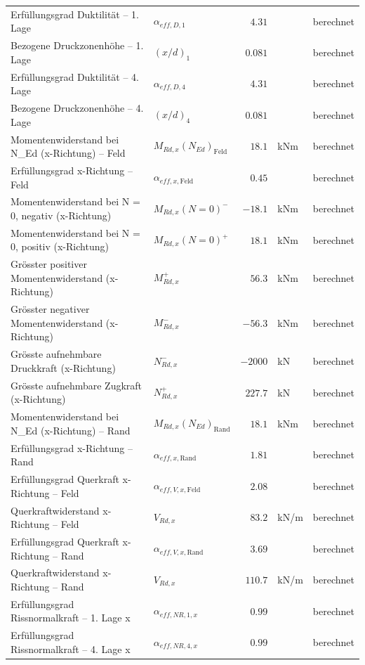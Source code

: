 \documentclass[11pt,a4paper]{article}
\begin{document}
\begin{xltabular}{\linewidth}{>{\raggedright\arraybackslash}Xlrll}
Erfüllungsgrad Duktilität – 1. Lage & $\alpha_{eff,D,1}$ & $4.31$ &  & berechnet \\
Bezogene Druckzonenhöhe – 1. Lage & $\left(x/d\right)_{1}$ & $0.081$ &  & berechnet \\
Erfüllungsgrad Duktilität – 4. Lage & $\alpha_{eff,D,4}$ & $4.31$ &  & berechnet \\
Bezogene Druckzonenhöhe – 4. Lage & $\left(x/d\right)_{4}$ & $0.081$ &  & berechnet \\
Momentenwiderstand bei N\_Ed (x-Richtung) – Feld & $M_{Rd,x}(N_{Ed})_{\text{Feld}}$ & $18.1$ & kNm & berechnet \\
Erfüllungsgrad x-Richtung – Feld & $\alpha_{eff,x,\text{Feld}}$ & $0.45$ &  & berechnet \\
Momentenwiderstand bei N = 0, negativ (x-Richtung) & $M_{Rd,x}(N=0)^{-}$ & $-18.1$ & kNm & berechnet \\
Momentenwiderstand bei N = 0, positiv (x-Richtung) & $M_{Rd,x}(N=0)^{+}$ & $18.1$ & kNm & berechnet \\
Grösster positiver Momentenwiderstand (x-Richtung) & $M_{Rd,x}^{+}$ & $56.3$ & kNm & berechnet \\
Grösster negativer Momentenwiderstand (x-Richtung) & $M_{Rd,x}^{-}$ & $-56.3$ & kNm & berechnet \\
Grösste aufnehmbare Druckkraft (x-Richtung) & $N_{Rd,x}^{-}$ & $-2000$ & kN & berechnet \\
Grösste aufnehmbare Zugkraft (x-Richtung) & $N_{Rd,x}^{+}$ & $227.7$ & kN & berechnet \\
Momentenwiderstand bei N\_Ed (x-Richtung) – Rand & $M_{Rd,x}(N_{Ed})_{\text{Rand}}$ & $18.1$ & kNm & berechnet \\
Erfüllungsgrad x-Richtung – Rand & $\alpha_{eff,x,\text{Rand}}$ & $1.81$ &  & berechnet \\
Erfüllungsgrad Querkraft x-Richtung – Feld & $\alpha_{eff,V,x,\text{Feld}}$ & $2.08$ &  & berechnet \\
Querkraftwiderstand x-Richtung – Feld & $V_{Rd,x}$ & $83.2$ & kN/m & berechnet \\
Erfüllungsgrad Querkraft x-Richtung – Rand & $\alpha_{eff,V,x,\text{Rand}}$ & $3.69$ &  & berechnet \\
Querkraftwiderstand x-Richtung – Rand & $V_{Rd,x}$ & $110.7$ & kN/m & berechnet \\
Erfüllungsgrad Rissnormalkraft – 1. Lage x & $\alpha_{eff,NR,1,x}$ & $0.99$ &  & berechnet \\
Erfüllungsgrad Rissnormalkraft – 4. Lage x & $\alpha_{eff,NR,4,x}$ & $0.99$ &  & berechnet \\

\end{xltabular}
\end{document}
